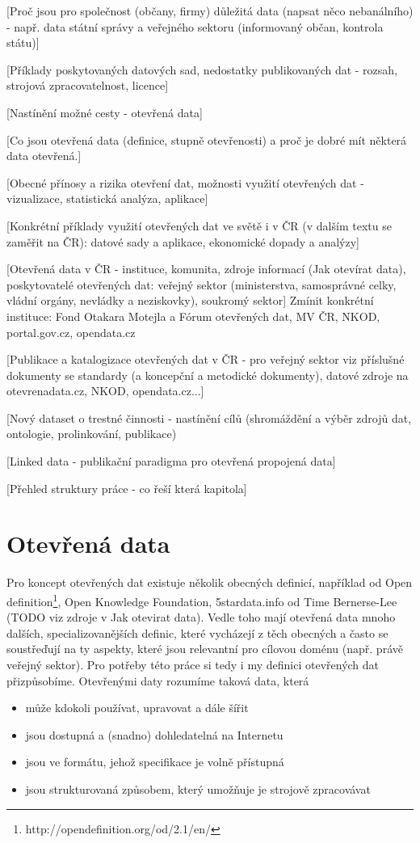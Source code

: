 [Proč jsou pro společnost (občany, firmy) důležitá data (napsat něco nebanálního) - např. data státní správy a veřejného sektoru (informovaný občan, kontrola státu)]

[Příklady poskytovaných datových sad, nedostatky publikovaných dat - rozsah, strojová zpracovatelnost, licence]

[Nastínění možné cesty - otevřená data]

[Co jsou otevřená data (definice, stupně otevřenosti) a proč je dobré mít některá data otevřená.]

[Obecné přínosy a rizika otevření dat, možnosti využití otevřených dat - vizualizace, statistická analýza, aplikace]

[Konkrétní příklady využití otevřených dat ve světě i v ČR (v dalším textu se zaměřit na ČR): datové sady a aplikace, ekonomické dopady a analýzy]

[Otevřená data v ČR - instituce, komunita, zdroje informací (Jak otevírat data), poskytovatelé otevřených dat: veřejný sektor (ministerstva, samosprávné celky, vládní orgány, nevládky a neziskovky), soukromý sektor]
Zmínit konkrétní instituce: Fond Otakara Motejla a Fórum otevřených dat, MV ČR, NKOD, portal.gov.cz, opendata.cz

[Publikace a katalogizace otevřených dat v ČR - pro veřejný sektor viz příslušné dokumenty se standardy (a koncepční a metodické dokumenty), datové zdroje na otevrenadata.cz, NKOD, opendata.cz...]

[Nový dataset o trestné činnosti - nastínění cílů (shromáždění a výběr zdrojů dat, ontologie, prolinkování, publikace)

[Linked data - publikační paradigma pro otevřená propojená data]

[Přehled struktury práce - co řeší která kapitola]

\chapter{Otevřená data}
Pro koncept otevřených dat existuje několik obecných definicí, například od Open definition\footnote{http://opendefinition.org/od/2.1/en/}, Open Knowledge Foundation, 5stardata.info od Time Bernerse-Lee (TODO viz zdroje v Jak otevirat data). Vedle toho mají otevřená data mnoho dalších, specializovanějších definic, které vycházejí z těch obecných a často se soustřeďují na ty aspekty, které jsou relevantní pro cílovou doménu (např. právě veřejný sektor). Pro potřeby této práce si tedy i my definici otevřených dat přizpůsobíme. Otevřenými daty rozumíme taková data, která
\begin{itemize}
	\item může kdokoli používat, upravovat a dále šířit
	\item jsou dostupná a (snadno) dohledatelná na Internetu
	\item jsou ve formátu, jehož specifikace je volně přístupná
	\item jsou strukturovaná způsobem, který umožňuje je strojově zpracovávat
\end{itemize}

